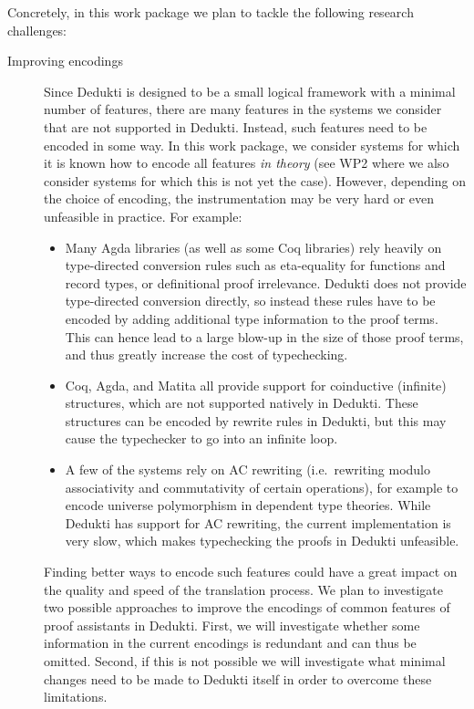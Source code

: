 Concretely, in this work package we plan to tackle the following
research challenges:
\begin{description}

  \item[Improving encodings] Since Dedukti is designed to be a small
  logical framework with a minimal number of features, there are many
  features in the systems we consider that are not supported in
  Dedukti. Instead, such features need to be encoded in some way. In
  this work package, we consider systems for which it is known how to
  encode all features \emph{in theory} (see WP2 where we also consider
  systems for which this is not yet the case). However, depending on
  the choice of encoding, the instrumentation may be very hard or even
  unfeasible in practice. For example:
  \begin{itemize}

    \item Many Agda libraries (as well as some Coq libraries) rely
    heavily on type-directed conversion rules such as eta-equality for
    functions and record types, or definitional proof
    irrelevance. Dedukti does not provide type-directed conversion
    directly, so instead these rules have to be encoded by adding
    additional type information to the proof terms. This can hence
    lead to a large blow-up in the size of those proof terms, and thus
    greatly increase the cost of typechecking.

    \item Coq, Agda, and Matita all provide support for coinductive
    (infinite) structures, which are not supported natively in
    Dedukti. These structures can be encoded by rewrite rules in
    Dedukti, but this may cause the typechecker to go into an infinite
    loop.

    \item A few of the systems rely on AC rewriting (i.e.~rewriting
    modulo associativity and commutativity of certain operations), for
    example to encode universe polymorphism in dependent type
    theories. While Dedukti has support for AC rewriting, the current
    implementation is very slow, which makes typechecking the proofs
    in Dedukti unfeasible.

  \end{itemize}
  Finding better ways to encode such features could have a great
  impact on the quality and speed of the translation process.  We plan
  to investigate two possible approaches to improve the encodings of
  common features of proof assistants in Dedukti. First, we will
  investigate whether some information in the current encodings is
  redundant and can thus be omitted. Second, if this is not possible
  we will investigate what minimal changes need to be made to Dedukti
  itself in order to overcome these limitations.


\end{description}
